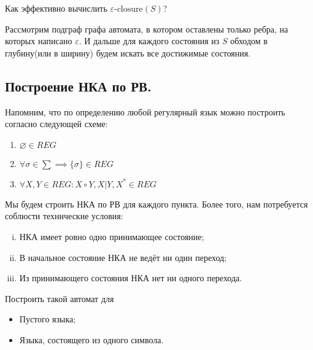 \begin{question}
  Как эффективно вычислить $\varepsilon\text{-closure}(S)$?
\end{question}

\begin{nonum}
  Рассмотрим подграф графа автомата, в котором оставлены только ребра, на которых написано $\varepsilon$.
  И дальше для каждого состояния из $S$ обходом в глубину(или в ширину) будем искать все достижимые состояния.
\end{nonum}


\subsection{Построение НКА по РВ.}

Напомним, что по определению любой регулярный язык
можно построить согласно следующей схеме:

\begin{enumerate}
  \item $\varnothing \in REG$
  \item $\forall\sigma \in \sum \implies \{\sigma\} \in  REG$
  \item $\forall X, Y \in REG: X \circ Y, X|Y, X^* \in REG$
\end{enumerate}

Мы будем строить НКА по РВ для каждого пункта. Более того,
нам потребуется соблюсти технические условия:

\begin{enumerate}[(i)]
  \item НКА имеет ровно одно принимающее состояние;
  \item В начальное состояние НКА не ведёт ни один переход;
  \item Из принимающего состояния НКА нет ни одного перехода.
\end{enumerate}

\begin{question}
  Построить такой автомат для
  \begin{itemize}
    \item Пустого языка;
    \item Языка, состоящего из одного символа.
  \end{itemize}
\end{question}



